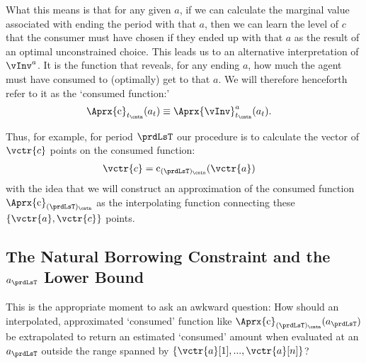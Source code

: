 What this means is that for any given ${a}$, if we can calculate the marginal value associated with ending the period with that ${a}$, then we can learn the level of ${c}$ that the consumer must have chosen if they ended up with that ${a}$ as the result of an optimal unconstrained choice.  This leads us to an alternative interpretation of $\vInv^{a}$. It is the function that reveals, for any ending ${a}$, how much the agent must have consumed to (optimally) get to that ${a}$.  We will therefore henceforth refer to it as the `consumed function:'
\begin{equation}\begin{gathered}\begin{aligned}
      \Aprx{\cFunc}_{\prd_\cntn}({a}_{\prd}) & \equiv \Aprx{\vInv}^{a}_{\prd_\cntn}({a}_{\prd}) \label{eq:consumedfn}.    
    \end{aligned}\end{gathered}\end{equation}

Thus, for example, for period $\prdLsT$ our procedure is to calculate the vector of $\vctr{c}$ points on the consumed function:
\begin{equation}\begin{gathered}\begin{aligned}
      \vctr{c} & = \cFunc_{({\prdLsT})_\cntn}(\vctr{a}) \label{eq:consumedfnvecs}     
    \end{aligned}\end{gathered}\end{equation}
with the idea that we will construct an approximation of the consumed function $\Aprx{\cFunc}_{({\prdLsT})_\cntn}$ as the interpolating function connecting these $\{\vctr{a},\vctr{c}\}$ points.

\hypertarget{the-natural-borrowing-constraint-and-the-a-lower-bound}{}
\subsection{The Natural Borrowing Constraint and the $a_{\prdLsT}$ Lower Bound} \label{subsec:LiqConstrSelfImposed}

This is the appropriate moment to ask an awkward question: How should an interpolated, approximated `consumed' function like $\Aprx{\cFunc}_{({\prdLsT})_\cntn}({a}_{\prdLsT})$ be extrapolated to return an estimated `consumed' amount when evaluated at an ${a}_{\prdLsT}$ outside the range spanned by $\{\vctr{{a}}[1],...,\vctr{a}[n]\}$?


